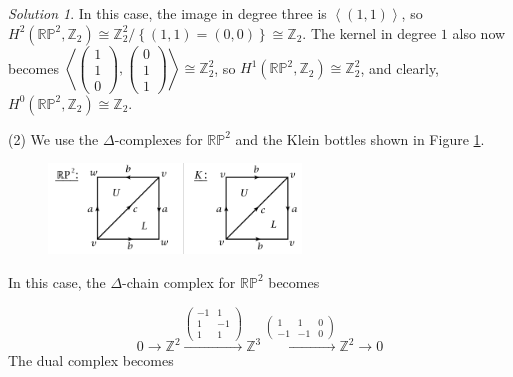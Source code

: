 \documentclass[reqno]{amsart}
\theoremstyle{definition}
\theoremstyle{remark}
\newtheorem*{solution}{Solution}
\begin{document}
\begin{solution}
         In this case, the image
         in degree three is
         $\left<
         (1,1) \right>$, so
         $H^{2}\left( \mathbb{R}\mathbb{P}^2,
         \mathbb{Z}_2 \right) 
         \cong \mathbb{Z}_2^2 / \left\{ (1,1) = (0,0) \right\} 
         \cong \mathbb{Z}_2$.
         The kernel in degree $1$ also now becomes
         $\left< 
         \begin{pmatrix} 1 \\ 1 \\ 0 \end{pmatrix},
         \begin{pmatrix} 0 \\ 1 \\ 1 \end{pmatrix} \right>
         \cong \mathbb{Z}_2^2$, so
         $H^{1}\left( \mathbb{R}\mathbb{P}^2,
         \mathbb{Z}_2\right)  \cong \mathbb{Z}_2^2$, and clearly,
         $H^{0}\left( \mathbb{R}\mathbb{P}^2, 
         \mathbb{Z}_2\right) \cong \mathbb{Z}_2$.




 (2) 
 We use the $\Delta$-complexes for $\mathbb{R}\mathbb{P}^2$ and
 the Klein bottles shown in Figure 
 \ref{fig:Figures/Delta-RP2-Klein.png}.

  \begin{figure}[htpb]
     \centering
     \includegraphics[width=0.6\textwidth]{Figures/Delta-RP2-Klein.png}
     \caption{}
     \label{fig:Figures/Delta-RP2-Klein.png}
 \end{figure}

 In this case, the $\Delta$-chain complex for
 $\mathbb{R}\mathbb{P}^2$ becomes

 \[
 0 \to \mathbb{Z}^2 
 \stackrel{
 \begin{pmatrix} 
     -1 & 1 \\
     1 & -1 \\
     1 & 1
\end{pmatrix} }{\to}  \mathbb{Z}^3 
\stackrel{
\begin{pmatrix} 
    1 & 1 & 0 \\
    -1 & -1 & 0
\end{pmatrix} }{\to} \mathbb{Z}^2 \to  0
 \] 
 The dual complex becomes


\end{solution}
\end{document}
